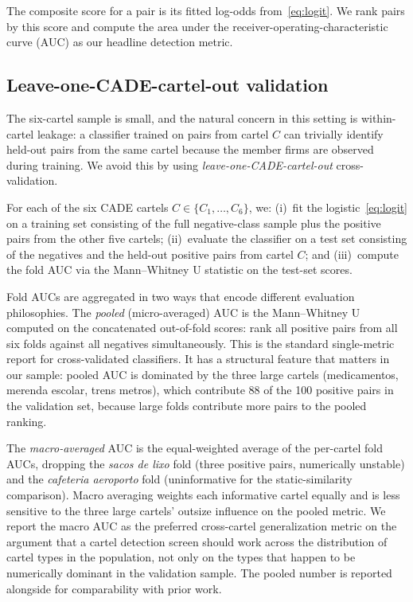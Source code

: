 The composite score for a pair is its fitted log-odds from~\eqref{eq:logit}. We rank pairs by this score and compute the area under the receiver-operating-characteristic curve (AUC) as our headline detection metric.

\subsection{Leave-one-CADE-cartel-out validation}\label{sec:strategy_cv}

The six-cartel sample is small, and the natural concern in this setting is within-cartel leakage: a classifier trained on pairs from cartel $C$ can trivially identify held-out pairs from the same cartel because the member firms are observed during training. We avoid this by using \emph{leave-one-CADE-cartel-out} cross-validation.

For each of the six CADE cartels $C \in \{C_1, \ldots, C_6\}$, we: (i)~fit the logistic~\eqref{eq:logit} on a training set consisting of the full negative-class sample plus the positive pairs from the other five cartels; (ii)~evaluate the classifier on a test set consisting of the negatives and the held-out positive pairs from cartel $C$; and (iii)~compute the fold AUC via the Mann--Whitney U statistic on the test-set scores.

Fold AUCs are aggregated in two ways that encode different evaluation philosophies. The \emph{pooled} (micro-averaged) AUC is the Mann--Whitney U computed on the concatenated out-of-fold scores: rank all positive pairs from all six folds against all negatives simultaneously. This is the standard single-metric report for cross-validated classifiers. It has a structural feature that matters in our sample: pooled AUC is dominated by the three large cartels (medicamentos, merenda escolar, trens metros), which contribute 88 of the 100 positive pairs in the validation set, because large folds contribute more pairs to the pooled ranking.

The \emph{macro-averaged} AUC is the equal-weighted average of the per-cartel fold AUCs, dropping the \emph{sacos de lixo} fold (three positive pairs, numerically unstable) and the \emph{cafeteria aeroporto} fold (uninformative for the static-similarity comparison). Macro averaging weights each informative cartel equally and is less sensitive to the three large cartels' outsize influence on the pooled metric. We report the macro AUC as the preferred cross-cartel generalization metric on the argument that a cartel detection screen should work across the distribution of cartel types in the population, not only on the types that happen to be numerically dominant in the validation sample. The pooled number is reported alongside for comparability with prior work.

